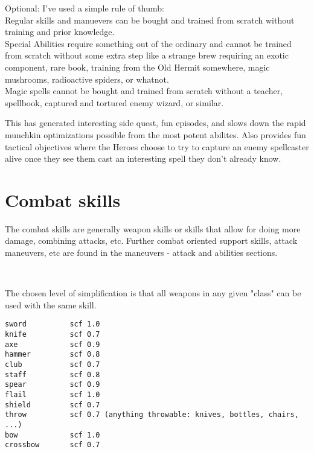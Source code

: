 Optional: I've used a simple rule of thumb: \\
Regular skills and manuevers can be bought and trained from scratch without training and prior knowledge. \\
Special Abilities require something out of the ordinary and cannot be trained from scratch without some extra step like a strange brew requiring an exotic component, rare book, training from the Old Hermit somewhere, magic mushrooms, radioactive spiders, or whatnot.\\
Magic spells cannot be bought and trained from scratch without a teacher, spellbook, captured and tortured enemy wizard, or similar.

This has generated interesting side quest, fun episodes, and slows down the rapid munchkin optimizations possible from the most potent abilites. Also provides fun tactical objectives where the Heroes choose to try to capture an enemy spellcaster alive once they see them cast an interesting spell they don't already know.

%










\section*{Combat skills}

The combat skills are generally weapon skills or skills that allow for doing more damage, combining attacks, etc. Further combat oriented support skills, attack maneuvers, etc are found in the maneuvers - attack and abilities sections.

\

\openskillslist

\begin{samepage}
 The chosen level of simplification is that all weapons in any given "class" can be used with the same skill.

\begin{verbatim}
sword          scf 1.0
knife          scf 0.7
axe            scf 0.9
hammer         scf 0.8
club           scf 0.7
staff          scf 0.8
spear          scf 0.9
flail          scf 1.0
shield         scf 0.7
throw          scf 0.7 (anything throwable: knives, bottles, chairs, ...)
bow            scf 1.0
crossbow       scf 0.7
\end{verbatim}
\end{samepage}

